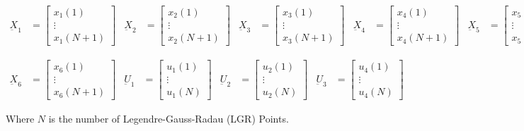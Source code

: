 \documentclass[11pt,usenames]{article}
\begin{document}
	\begin{align}
	\underbar X_{1} &=
	\begin{bmatrix}
	x_{1}(1) \\ \vdots \\  x_{1}(N+1) 
	\end{bmatrix}
	& \underbar X_{2} &=
	\begin{bmatrix}
	x_{2}(1) \\  \vdots \\  x_{2}(N+1) 
	\end{bmatrix}
	& \underbar X_{3} &= 
	\begin{bmatrix}
	x_{3}(1) \\  \vdots \\  x_{3}(N+1) 
	\end{bmatrix}
	& \underbar X_{4} &= 
	\begin{bmatrix}
	x_{4}(1) \\  \vdots \\  x_{4}(N+1) 
	\end{bmatrix}
	& \underbar X_{5} &= 
	\begin{bmatrix}
	x_{5}(1) \\  \vdots \\  x_{5}(N+1)  
	\end{bmatrix} 
	\end{align}
	
	\begin{align}
	\underbar X_{6} &=
	\begin{bmatrix}
	x_{6}(1) \\ \vdots \\  x_{6}(N+1) 
	\end{bmatrix}
	& \underbar U_{1} &=
	\begin{bmatrix}
	u_{1}(1) \\  \vdots \\  u_{1}(N) 
	\end{bmatrix}
	& \underbar U_{2} &= 
	\begin{bmatrix}
	u_{2}(1) \\  \vdots \\  u_{2}(N) 
	\end{bmatrix}
	& \underbar U_{3} &= 
	\begin{bmatrix}
	u_{4}(1) \\  \vdots \\  u_{4}(N) 
	\end{bmatrix}
	\end{align}
	
	Where $N$ is the number of Legendre-Gauss-Radau (LGR) Points.
	
\end{document}
